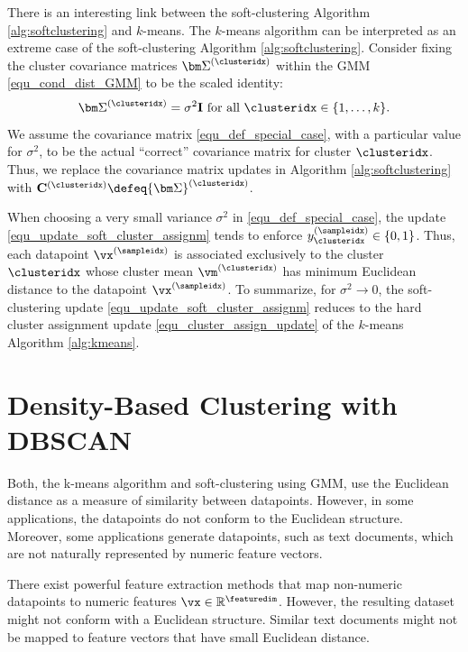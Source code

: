 \documentclass[12pt]{report}
\newcommand{\featurelen}{\featuredim}
\begin{document}
There is an interesting link between the soft-clustering Algorithm \ref{alg:softclustering} and $k$-means. The 
$k$-means algorithm can be interpreted as an extreme case of the soft-clustering Algorithm \ref{alg:softclustering}. 
Consider fixing the cluster covariance matrices $ {\bm \Sigma}^{(\clusteridx)}$ within the GMM \eqref{equ_cond_dist_GMM} 
to be the scaled identity: 
\begin{equation}
\label{equ_def_special_case}
 {\bm \Sigma}^{(\clusteridx)}= \sigma^{2} \mathbf{I} \mbox{ for all } \clusteridx \in \{1,\ldots,k\}.  
\end{equation} 
We assume the covariance matrix \eqref{equ_def_special_case}, with a particular value for $\sigma^{2}$, 
to be the actual ``correct'' covariance matrix for cluster $\clusteridx$. %
Thus, we replace the covariance matrix updates in Algorithm \ref{alg:softclustering} 
with $\mathbf{C}^{(\clusteridx)} \defeq  {\bm \Sigma}^{(\clusteridx)}$.
 
When choosing a very small variance $\sigma^{2}$ in \eqref{equ_def_special_case}, 
the update \eqref{equ_update_soft_cluster_assignm} tends to enforce 
$y_{\clusteridx}^{(\sampleidx)} \in \{0,1\}$. Thus, each datapoint $\vx^{(\sampleidx)}$ 
is associated exclusively to the cluster $\clusteridx$ whose cluster mean $\vm^{(\clusteridx)}$ 
has minimum Euclidean distance to the datapoint $\vx^{(\sampleidx)}$. 
To summarize, for $\sigma^{2} \rightarrow 0$, the soft-clustering update 
\eqref{equ_update_soft_cluster_assignm} reduces to the hard cluster 
assignment update \eqref{equ_cluster_assign_update} of the $k$-means Algorithm \ref{alg:kmeans}. 

\section{Density-Based Clustering with DBSCAN}

Both, the k-means algorithm and soft-clustering using GMM, use the Euclidean distance as a measure of similarity 
between datapoints. However, in some applications, the datapoints do not conform to the Euclidean structure. 
Moreover, some applications generate datapoints, such as text documents, which are not naturally represented 
by numeric feature vectors. 

There exist powerful feature extraction methods that map non-numeric datapoints to numeric features $\vx \in \mathbb{R}^{\featurelen}$. 
However, the resulting dataset might not conform with a Euclidean structure. Similar text documents 
might not be mapped to feature vectors that have small Euclidean distance. 
\end{document}
